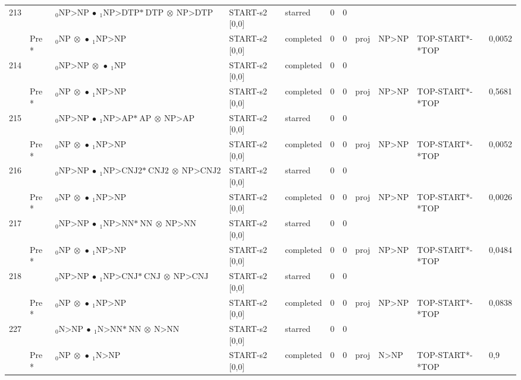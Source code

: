 \documentclass[10pt]{article}
\begin{document}
\begin{longtable}[htbp]{lllllllllll}
213 & & $ {}_0 \textrm{NP>NP} \  \bullet \ {}_{1} \textrm{NP>DTP*} \ \textrm{DTP} \  \otimes \ \textrm{NP>DTP} $ & START-s2 [0,0] & starred & 0 & 0 & & & & \\ 
 & Pre *& $ {}_0 \textrm{NP} \  \otimes \  \bullet \ {}_{1} \textrm{NP>NP} $ & START-s2 [0,0] & completed & 0 & 0 & proj & NP>NP & TOP-START*-*TOP & 0,0052 \\ 
214 & & $ {}_0 \textrm{NP>NP} \  \otimes \  \bullet \ {}_{1} \textrm{NP} $ & START-s2 [0,0] & completed & 0 & 0 & & & & \\ 
 & Pre *& $ {}_0 \textrm{NP} \  \otimes \  \bullet \ {}_{1} \textrm{NP>NP} $ & START-s2 [0,0] & completed & 0 & 0 & proj & NP>NP & TOP-START*-*TOP & 0,5681 \\ 
215 & & $ {}_0 \textrm{NP>NP} \  \bullet \ {}_{1} \textrm{NP>AP*} \ \textrm{AP} \  \otimes \ \textrm{NP>AP} $ & START-s2 [0,0] & starred & 0 & 0 & & & & \\ 
 & Pre *& $ {}_0 \textrm{NP} \  \otimes \  \bullet \ {}_{1} \textrm{NP>NP} $ & START-s2 [0,0] & completed & 0 & 0 & proj & NP>NP & TOP-START*-*TOP & 0,0052 \\ 
216 & & $ {}_0 \textrm{NP>NP} \  \bullet \ {}_{1} \textrm{NP>CNJ2*} \ \textrm{CNJ2} \  \otimes \ \textrm{NP>CNJ2} $ & START-s2 [0,0] & starred & 0 & 0 & & & & \\ 
 & Pre *& $ {}_0 \textrm{NP} \  \otimes \  \bullet \ {}_{1} \textrm{NP>NP} $ & START-s2 [0,0] & completed & 0 & 0 & proj & NP>NP & TOP-START*-*TOP & 0,0026 \\ 
217 & & $ {}_0 \textrm{NP>NP} \  \bullet \ {}_{1} \textrm{NP>NN*} \ \textrm{NN} \  \otimes \ \textrm{NP>NN} $ & START-s2 [0,0] & starred & 0 & 0 & & & & \\ 
 & Pre *& $ {}_0 \textrm{NP} \  \otimes \  \bullet \ {}_{1} \textrm{NP>NP} $ & START-s2 [0,0] & completed & 0 & 0 & proj & NP>NP & TOP-START*-*TOP & 0,0484 \\ 
218 & & $ {}_0 \textrm{NP>NP} \  \bullet \ {}_{1} \textrm{NP>CNJ*} \ \textrm{CNJ} \  \otimes \ \textrm{NP>CNJ} $ & START-s2 [0,0] & starred & 0 & 0 & & & & \\ 
 & Pre *& $ {}_0 \textrm{NP} \  \otimes \  \bullet \ {}_{1} \textrm{NP>NP} $ & START-s2 [0,0] & completed & 0 & 0 & proj & NP>NP & TOP-START*-*TOP & 0,0838 \\ 
227 & & $ {}_0 \textrm{N>NP} \  \bullet \ {}_{1} \textrm{N>NN*} \ \textrm{NN} \  \otimes \ \textrm{N>NN} $ & START-s2 [0,0] & starred & 0 & 0 & & & & \\ 
 & Pre *& $ {}_0 \textrm{NP} \  \otimes \  \bullet \ {}_{1} \textrm{N>NP} $ & START-s2 [0,0] & completed & 0 & 0 & proj & N>NP & TOP-START*-*TOP & 0,9 \\ 

\end{longtable}
\end{document}
